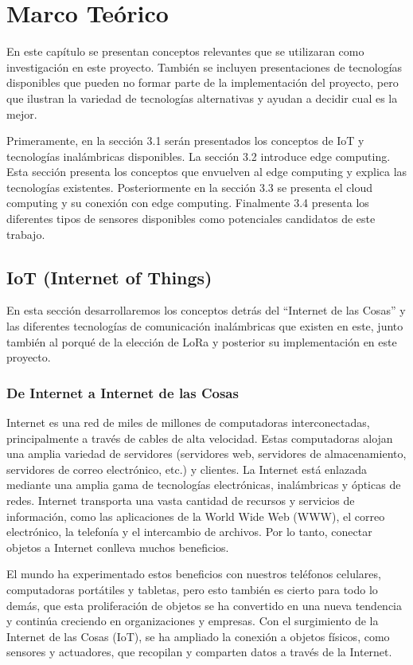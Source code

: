 \newpage
\section{Marco Teórico}
En este capítulo se presentan conceptos relevantes que se utilizaran como investigación en este proyecto. También se incluyen presentaciones de tecnologías disponibles que pueden no formar parte de la implementación del proyecto, pero que ilustran la variedad de tecnologías alternativas y ayudan a decidir cual es la mejor.

Primeramente, en la sección 3.1 serán presentados los conceptos de IoT y tecnologías inalámbricas disponibles. La sección 3.2 introduce edge computing. Esta sección presenta los conceptos que envuelven al edge computing y explica las tecnologías existentes. Posteriormente en la sección 3.3 se presenta el cloud computing y su conexión con edge computing. Finalmente 3.4 presenta los diferentes tipos de sensores disponibles como potenciales candidatos de este trabajo.

\subsection{IoT (Internet of Things)}
En esta sección desarrollaremos los conceptos detrás del “Internet de las Cosas” y las diferentes tecnologías de comunicación inalámbricas que existen en este, junto también al porqué de la elección de LoRa y posterior su implementación en este proyecto.

\subsubsection{De Internet a Internet de las Cosas}
Internet es una red de miles de millones de computadoras interconectadas, principalmente a través de cables de alta velocidad. Estas computadoras alojan una amplia variedad de servidores (servidores web, servidores de almacenamiento, servidores de correo electrónico, etc.) y clientes. La Internet está enlazada mediante una amplia gama de tecnologías electrónicas, inalámbricas y ópticas de redes. Internet transporta una vasta cantidad de recursos y servicios de información, como las aplicaciones de la World Wide Web (WWW), el correo electrónico, la telefonía y el intercambio de archivos. Por lo tanto, conectar objetos a Internet conlleva muchos beneficios. 

El mundo ha experimentado estos beneficios con nuestros teléfonos celulares, computadoras portátiles y tabletas, pero esto también es cierto para todo lo demás, que esta proliferación de objetos se ha convertido en una nueva tendencia y continúa creciendo en organizaciones y empresas. Con el surgimiento de la Internet de las Cosas (IoT), se ha ampliado la conexión a objetos físicos, como sensores y actuadores, que recopilan y comparten datos a través de la Internet.

